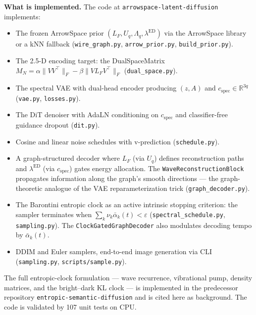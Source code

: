 \documentclass[11pt]{article}
\newcommand{\Lf}{L_F}
\newcommand{\Uq}{U_q}
\newcommand{\Lq}{\Lambda_q}
\newcommand{\ed}{\lambda^{\mathrm{ED}}}
\newcommand{\R}{\mathbb{R}}
\begin{document}
        \begin{framed}
        \noindent\textbf{What is implemented.} The code at
        \texttt{arrowspace-latent-diffusion} implements:
        \begin{itemize}[leftmargin=1.5em]
        \item The frozen ArrowSpace prior $(\Lf, \Uq, \Lq, \ed)$ via the
              ArrowSpace library or a kNN fallback (\texttt{wire\_graph.py},
              \texttt{arrow\_prior.py}, \texttt{build\_prior.py}).
        \item The 2.5-D encoding target: the DualSpaceMatrix
              $M_N = \alpha\|VV^\top\|_F - \beta\|V \Lf V^\top\|_F$
              (\texttt{dual\_space.py}).
        \item The spectral VAE with dual-head encoder producing $(z, A)$
              and $c_{\mathrm{spec}} \in \R^{3q}$
              (\texttt{vae.py}, \texttt{losses.py}).
        \item The DiT denoiser with AdaLN conditioning on $c_{\mathrm{spec}}$
              and classifier-free guidance dropout (\texttt{dit.py}).
        \item Cosine and linear noise schedules with v-prediction
              (\texttt{schedule.py}).
        \item A graph-structured decoder where $L_F$ (via $\Uq$) defines
              reconstruction paths and $\ed$ (via $c_{\mathrm{spec}}$) gates
              energy allocation. The \texttt{WaveReconstructionBlock}
              propagates information along the graph's smooth directions ---
              the graph-theoretic analogue of the VAE reparameterization trick
              (\texttt{graph\_decoder.py}).
        \item The Barontini entropic clock as an active intrinsic stopping
              criterion: the sampler terminates when
              $\sum_k \nu_k \bar\alpha_k(t) < \varepsilon$
              (\texttt{spectral\_schedule.py}, \texttt{sampling.py}).
              The \texttt{ClockGatedGraphDecoder} also modulates decoding
              tempo by $\bar\alpha_k(t)$.
        \item DDIM and Euler samplers, end-to-end image generation via CLI
              (\texttt{sampling.py}, \texttt{scripts/sample.py}).
        \end{itemize}
        The full entropic-clock formulation --- wave recurrence,
        vibrational pump, density matrices, and the bright--dark KL clock
        --- is implemented in the predecessor repository
        \texttt{entropic-semantic-diffusion} and is cited here as
        background. The code is validated by 107 unit tests on CPU.
        \end{framed}
\end{document}
